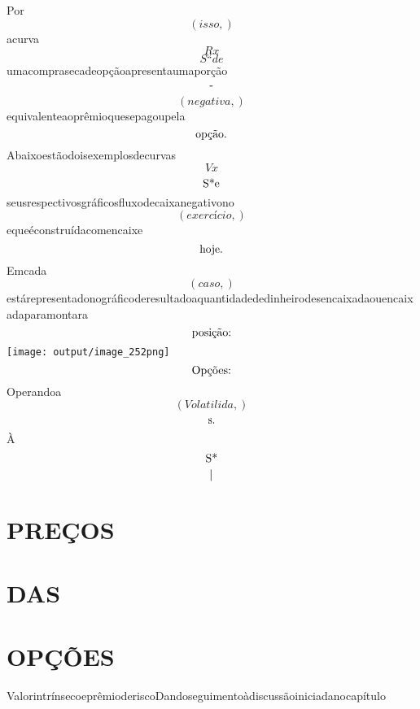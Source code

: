 \documentclass{article}
\begin{document}
\begin{equation}
\end{equation}Por\begin{equation}
\left( isso,\right)
\end{equation}acurva\begin{equation}
R x
\end{equation}\begin{equation}
S“de
\end{equation}umacomprasecadeopçãoapresentaumaporção\begin{equation}
$-$
\end{equation}\begin{equation}
\left( negativa,\right)
\end{equation}equivalenteaoprêmioquesepagoupela\begin{equation}
$opção.$
\end{equation}Abaixoestãodoisexemplosdecurvas\begin{equation}
V x
\end{equation}\begin{equation}
$S*e$
\end{equation}seusrespectivosgráficosfluxodecaixanegativono\begin{equation}
\left( exercício,\right)
\end{equation}equeéconstruídacomencaixe\begin{equation}
$hoje.$
\end{equation}Emcada\begin{equation}
\left( caso,\right)
\end{equation}estárepresentadonográficoderesultadoaquantidadededinheirodesencaixadaouencaixadaparamontara\begin{equation}
$posição:$
\end{equation}\texttt{[image: output/image\_252png]}\begin{equation}
$Opções:$
\end{equation}Operandoa\begin{equation}
\left( Volatilida,\right)
\end{equation}\begin{equation}
$s.$
\end{equation}À\begin{equation}
$S*$
\end{equation}\begin{equation}
$|$
\end{equation}\section{PREÇOS}\section{DAS}\section{OPÇÕES}ValorintrínsecoeprêmioderiscoDandoseguimentoàdiscussãoiniciadanocapítulo\begin{equation}

\end{equation}
\end{document}

